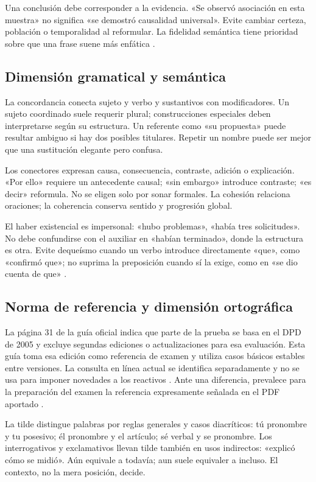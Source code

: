 Una conclusión debe corresponder a la evidencia. «Se observó asociación en esta muestra» no significa «se demostró causalidad universal». Evite cambiar certeza, población o temporalidad al reformular. La fidelidad semántica tiene prioridad sobre que una frase suene más enfática \cite[págs. 29--31]{ceneval}.

\subsection{Dimensión gramatical y semántica}
La concordancia conecta sujeto y verbo y sustantivos con modificadores. Un sujeto coordinado suele requerir plural; construcciones especiales deben interpretarse según su estructura. Un referente como «su propuesta» puede resultar ambiguo si hay dos posibles titulares. Repetir un nombre puede ser mejor que una sustitución elegante pero confusa.

Los conectores expresan causa, consecuencia, contraste, adición o explicación. «Por ello» requiere un antecedente causal; «sin embargo» introduce contraste; «es decir» reformula. No se eligen solo por sonar formales. La cohesión relaciona oraciones; la coherencia conserva sentido y progresión global.

El haber existencial es impersonal: «hubo problemas», «había tres solicitudes». No debe confundirse con el auxiliar en «habían terminado», donde la estructura es otra. Evite dequeísmo cuando un verbo introduce directamente «que», como «confirmó que»; no suprima la preposición cuando sí la exige, como en «se dio cuenta de que» \cite[entradas concordancia, haber, queísmo y dequeísmo]{rae}.

\subsection{Norma de referencia y dimensión ortográfica}
La página 31 de la guía oficial indica que parte de la prueba se basa en el DPD de 2005 y excluye segundas ediciones o actualizaciones para esa evaluación. Esta guía toma esa edición como referencia de examen y utiliza casos básicos estables entre versiones. La consulta en línea actual se identifica separadamente y no se usa para imponer novedades a los reactivos \cite{raehoy}. Ante una diferencia, prevalece para la preparación del examen la referencia expresamente señalada en el PDF aportado \cite[pág. 31]{ceneval}.

La tilde distingue palabras por reglas generales y casos diacríticos: tú pronombre y tu posesivo; él pronombre y el artículo; sé verbal y se pronombre. Los interrogativos y exclamativos llevan tilde también en usos indirectos: «explicó cómo se midió». Aún equivale a todavía; aun suele equivaler a incluso. El contexto, no la mera posición, decide.

